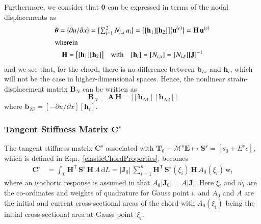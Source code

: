 Furthermore, we consider that $\boldsymbol{\theta}$ can be expressed in terms of the nodal displacements as
\begin{subequations}
    \begin{gather}
    \boldsymbol{\theta} =  \bigl\{
    \partial u / \partial x
    \bigr\}
    = \bigl\{ \begin{matrix}
    \sum\nolimits_{i=1}^2 N_{i,x} \, u_i
    \end{matrix} \bigr\}
    = \bigl[ [\mathbf{h}_1] [\mathbf{h}_2] \bigr] 
    \bigl\{ \mathbf{u}^{(e)} \bigr\}
    = \mathbf{H} \, \mathbf{u}^{(e)} \\
    \intertext{wherein}
    \mathbf{H} = \bigl[ [\mathbf{h}_1] [\mathbf{h}_2] \bigr]
    \quad \text{with} \quad
    [\mathbf{h}_i] = [N_{i,x}] = [N_{i,\xi}] [ \mathbf{J}]^{-1}
    \end{gather}
\end{subequations}
and we see that, for the chord, there is no difference between $\mathbf{b}_{Li}$ and $\mathbf{h}_i$, which will not be the case in higher-dimensional spaces.  Hence, the nonlinear strain-displacement matrix $\mathbf{B}_N$ can be written as
\begin{equation}
    \mathbf{B}_N = \mathbf{A} \, \mathbf{H}  =  
    \bigl[ [\mathbf{b}_{N1}] [\mathbf{b}_{N2}] \bigr]
\end{equation}
where $\mathbf{b}_{Ni} = [-\partial u / \partial x] [ \mathbf{h}_i ]$.

\subsubsection{Tangent Stiffness Matrix $\mathbf{C}^s$}

The tangent stiffness matrix $\mathbf{C}^s$  associated with $\boldsymbol{T}_0 + 
\boldsymbol{\mathcal{M}}^s \boldsymbol{E} \mapsto \mathbf{S}^s = [ s_0 + E^s e ]$, which is defined in Eqn.~\eqref{elasticChordProperties}, becomes 
\begin{equation}
	\begin{aligned}
		\mathbf{C}^s & = \int_{L} \mathbf{H}^{\mathsf{T}} \,  \mathbf{S}^s \, \mathbf{H} \, A \, \mathrm{d} L
	     = | \mathbf{J}_0 |  \, \sum_{i=1}^{n} \mathbf{H}^{\mathsf{T}} \, \mathbf{S}^s (\xi_i) \, \mathbf{H} \, A_0 (\xi_i)  \, \mathrm{w}_i 
	\end{aligned}
\end{equation}
where an isochoric response is assumed in that $A_0 | \mathbf{J}_0 | = A | \mathbf{J} |$. Here $\xi_i$ and $w_i$ are the co-ordinates and weights of quadrature for Gauss point $i$, and $A_0$ and $A$ are the initial and current cross-sectional areas of the chord with $A_0 (\xi_i)$ being the initial cross-sectional area at Gauss point~$\xi_i$.


